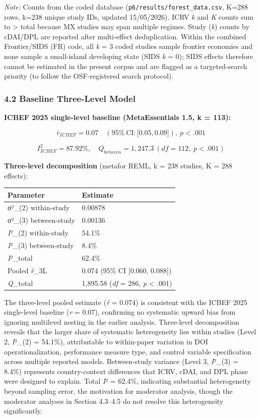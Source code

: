 \documentclass[
  12pt,a4paper]{article}
\begin{document}
\emph{Note:} Counts from the coded database
(\texttt{p6/results/forest\_data.csv}, K=288 rows, k=238 unique study
IDs, updated 15/05/2026). ICRV \emph{k} and \emph{K} counts sum to
\textgreater{} total because MX studies may span multiple regimes. Study
(\emph{k}) counts by cDAI/DPL are reported after multi-effect
deduplication. Within the combined Frontier/SIDS (FR) code, all \emph{k} =
3 coded studies sample frontier economies and none sample a small-island
developing state (SIDS \emph{k} = 0); SIDS effects therefore cannot be
estimated in the present corpus and are flagged as a targeted-search
priority (to follow the OSF-registered search protocol).

\hypertarget{baseline-three-level-model}{%
\subsubsection{4.2 Baseline Three-Level
Model}\label{baseline-three-level-model}}

\textbf{ICBEF 2025 single-level baseline (MetaEssentials 1.5, k = 113):}

\[{\bar{r}}_{ICBEF} = 0.07\quad\left( 95\%\ \text{CI}:\lbrack 0.05, 0.09\rbrack \right), \ p < .001\]

\[I_{ICBEF}^{2} = 87.92\%, \quad Q_{between} = 1,247.3\ (df = 112, \ p < .001)\]

\textbf{Three-level decomposition} (metafor REML, k = 238 studies, K =
288 effects):

\begin{longtable}[]{@{}ll@{}}
\toprule\noalign{}
Parameter & Estimate \\
\midrule\noalign{}
\endhead
\bottomrule\noalign{}
\endlastfoot
σ²\_(2) within-study & 0.00878 \\
σ²\_(3) between-study & 0.00136 \\
\emph{I}²\_(2) within-study & 54.1\% \\
\emph{I}²\_(3) between-study & 8.4\% \\
\emph{I}²\_total & 62.4\% \\
Pooled \emph{r̂}\_3L & 0.074 (95\% CI {[}0.060, 0.088{]}) \\
\emph{Q}\_total & 1,895.58 (\emph{df} = 286, \emph{p} \textless{}
.001) \\
\end{longtable}

The three-level pooled estimate (\emph{r̂} = 0.074) is consistent with
the ICBEF 2025 single-level baseline (\emph{r} = 0.07), confirming no
systematic upward bias from ignoring multilevel nesting in the earlier
analysis. Three-level decomposition reveals that the larger share of
systematic heterogeneity lies within studies (Level 2, \emph{I}²\_(2) =
54.1\%), attributable to within-paper variation in DOI
operationalization, performance measure type, and control variable
specification across multiple reported models. Between-study variance
(Level 3, \emph{I}²\_(3) = 8.4\%) represents country-context differences
that ICRV, cDAI, and DPL phase were designed to explain. Total \emph{I}²
= 62.4\%, indicating substantial heterogeneity beyond sampling error,
the motivation for moderator analysis, though the moderator analyses in
Section 4.3--4.5 do not resolve this heterogeneity significantly.
\end{document}
